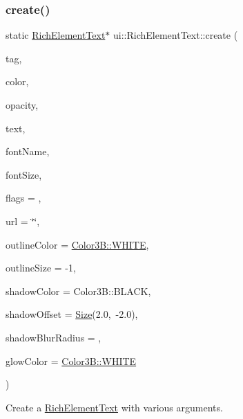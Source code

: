 \subsubsection{\texorpdfstring{create()}{create()}\hspace{0.1cm}{\footnotesize\ttfamily [2/2]}}
{\footnotesize\ttfamily static \hyperlink{classui_1_1RichElementText}{Rich\+Element\+Text}$\ast$ ui\+::\+Rich\+Element\+Text\+::create (\begin{DoxyParamCaption}\item[{int}]{tag,  }\item[{const \hyperlink{structColor3B}{Color3B} \&}]{color,  }\item[{G\+Lubyte}]{opacity,  }\item[{const std\+::string \&}]{text,  }\item[{const std\+::string \&}]{font\+Name,  }\item[{float}]{font\+Size,  }\item[{uint32\+\_\+t}]{flags = {},  }\item[{const std\+::string \&}]{url = {\ttfamily \char`\"{}\char`\"{}},  }\item[{const \hyperlink{structColor3B}{Color3B} \&}]{outline\+Color = {\ttfamily \hyperlink{structColor3B_adf57cb86ca15f434b29215ad471cdc35}{Color3\+B\+::\+W\+H\+I\+TE}},  }\item[{int}]{outline\+Size = {\ttfamily -\/1},  }\item[{const \hyperlink{structColor3B}{Color3B} \&}]{shadow\+Color = {\ttfamily Color3B\+:\+:BLACK},  }\item[{const cocos2d\+::\+Size \&}]{shadow\+Offset = {\ttfamily \hyperlink{classSize}{Size}(2.0,~-\/2.0)},  }\item[{int}]{shadow\+Blur\+Radius = {},  }\item[{const \hyperlink{structColor3B}{Color3B} \&}]{glow\+Color = {\ttfamily \hyperlink{structColor3B_adf57cb86ca15f434b29215ad471cdc35}{Color3\+B\+::\+W\+H\+I\+TE}} }\end{DoxyParamCaption})\hspace{0.3cm}{\ttfamily [static]}}



Create a \hyperlink{classui_1_1RichElementText}{Rich\+Element\+Text} with various arguments. 


